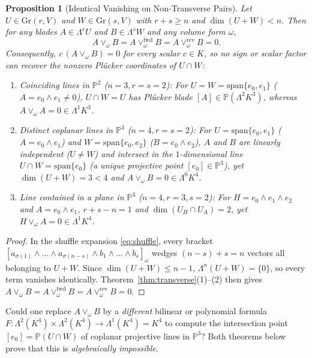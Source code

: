 \documentclass[11pt]{article}
\newtheorem{proposition}[theorem]{Proposition}
\theoremstyle{definition}
\newcommand{\Gr}{\mathrm{Gr}}
\newcommand{\spn}{\mathrm{span}}
\newcommand{\Psp}{\mathbb{P}}
\begin{document}
\begin{proposition}[Identical Vanishing on Non-Transverse Pairs]\label{prop:r2-vanish}
Let $U \in \Gr(r, V)$ and $W \in \Gr(s, V)$ with $r + s \ge n$ and $\dim(U + W) < n$. Then for any blades $A \in \Lambda^r U$ and $B \in \Lambda^s W$ and any volume form $\omega$,
\[
  A \vee_\omega B = A \vee_\omega^{\mathrm{fwd}} B = A \vee_\omega^{\mathrm{rev}} B = 0.
\]
Consequently, $c\,(A \vee_\omega B) = 0$ for \emph{every} scalar $c \in K$, so no sign or scalar factor can recover the nonzero Pl\"ucker coordinates of $U \cap W$:
\begin{enumerate}
  \item \emph{Coinciding lines in $\Psp^2$ ($n = 3, r = s = 2$):} For $U = W = \spn\{e_0, e_1\}$ ($A = e_0 \wedge e_1 \neq 0$), $U \cap W = U$ has Pl\"ucker blade $[A] \in \Psp(\Lambda^2 K^3)$, whereas $A \vee_\omega A = 0 \in \Lambda^1 K^3$.
  \item \emph{Distinct coplanar lines in $\Psp^3$ ($n = 4, r = s = 2$):} For $U = \spn\{e_0, e_1\}$ ($A = e_0 \wedge e_1$) and $W = \spn\{e_0, e_2\}$ ($B = e_0 \wedge e_2$), $A$ and $B$ are linearly independent ($U \neq W$) and intersect in the $1$-dimensional line $U \cap W = \spn\{e_0\}$ (a unique projective point $[e_0] \in \Psp^3$), yet $\dim(U + W) = 3 < 4$ and $A \vee_\omega B = 0 \in \Lambda^0 K^4$.
  \item \emph{Line contained in a plane in $\Psp^3$ ($n = 4, r = 3, s = 2$):} For $H = e_0 \wedge e_1 \wedge e_2$ and $A = e_0 \wedge e_1$, $r + s - n = 1$ and $\dim(U_H \cap U_A) = 2$, yet $H \vee_\omega A = 0 \in \Lambda^1 K^4$.
\end{enumerate}
\end{proposition}
\begin{proof}
In the shuffle expansion \eqref{eq:shuffle}, every bracket $[a_{\sigma(1)} \wedge \dots \wedge a_{\sigma(n-s)} \wedge b_1 \wedge \dots \wedge b_s]_\omega$ wedges $(n-s) + s = n$ vectors all belonging to $U + W$. Since $\dim(U + W) \le n - 1$, $\Lambda^n(U + W) = \{0\}$, so every term vanishes identically. Theorem~\ref{thm:transverse}(1)--(2) then gives $A \vee_\omega B = A \vee_\omega^{\mathrm{fwd}} B = A \vee_\omega^{\mathrm{rev}} B = 0$.
\end{proof}

Could one replace $A \vee_\omega B$ by a \emph{different} bilinear or polynomial formula $F : \Lambda^2(K^4) \times \Lambda^2(K^4) \to \Lambda^1(K^4) = K^4$ to compute the intersection point $[e_0] = \Psp(U \cap W)$ of coplanar projective lines in $\Psp^3$? Both theorems below prove that this is \emph{algebraically impossible}.
\end{document}
